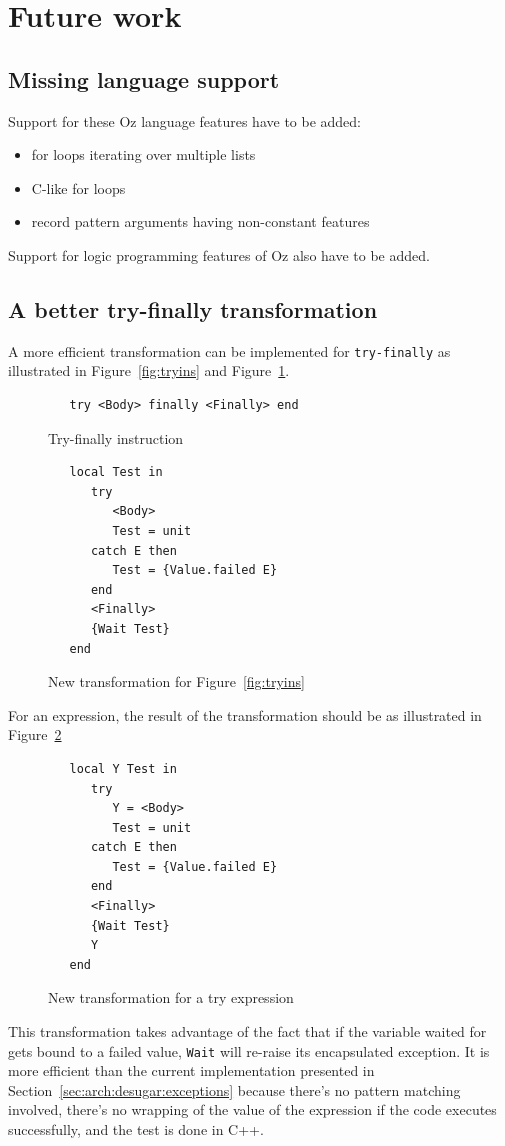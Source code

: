 \documentclass[a4paper]{memoir}
\begin{document}
\section{Future work}\label{sec:futurework}
\subsection{Missing language support}
Support for these Oz language features have to be added:
\begin{itemize}
  \item for loops iterating over multiple lists
  \item C-like for loops
  \item record pattern arguments having non-constant features
\end{itemize}

Support for logic programming features of Oz also have to be added.

\subsection{A better try-finally transformation}
A more efficient transformation can be implemented for \lstinline!try-finally! as
illustrated in Figure~\ref{fig:tryins} and Figure~\ref{fig:newtry}.

\begin{figure}
\begin{lstlisting}
   try <Body> finally <Finally> end
\end{lstlisting}
\caption{Try-finally instruction}
\label{fig:tryins}
\begin{lstlisting}
   local Test in
      try
         <Body>
         Test = unit
      catch E then
         Test = {Value.failed E}
      end
      <Finally>
      {Wait Test}
   end
\end{lstlisting}
\caption{New transformation for Figure~\ref{fig:tryins}}
\label{fig:newtry}
\end{figure}

For an expression, the result of the transformation should be as illustrated in Figure~\ref{fig:newtryexp}
\begin{figure}
\begin{lstlisting}
   local Y Test in
      try
         Y = <Body>
         Test = unit
      catch E then
         Test = {Value.failed E}
      end
      <Finally>
      {Wait Test}
      Y
   end
\end{lstlisting}
\caption{New transformation for a try expression}
\label{fig:newtryexp}
\end{figure}
This transformation takes advantage of the fact that if the variable waited for
gets bound to a failed value, \lstinline!Wait! will re-raise its encapsulated
exception. 
It is more efficient than the current implementation presented in Section~\ref{sec:arch:desugar:exceptions} because
there's no pattern matching involved,
there's no wrapping of the value of the expression if the code executes successfully, and the test is done in C++.
\end{document}
